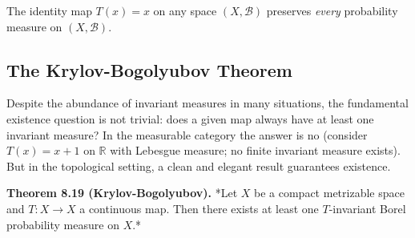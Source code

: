 \begin{example}
The identity map $T(x) = x$ on any space $(X, \mathcal{B})$ preserves \textit{every} probability measure on $(X, \mathcal{B})$.
\end{example}


\subsection{The Krylov-Bogolyubov Theorem}\label{sec:8.3.3}

Despite the abundance of invariant measures in many situations, the fundamental existence question is not trivial: does a given map always have at least one invariant measure? In the measurable category the answer is no (consider $T(x) = x + 1$ on $\mathbb{R}$ with Lebesgue measure; no finite invariant measure exists). But in the topological setting, a clean and elegant result guarantees existence.

\textbf{Theorem 8.19 (Krylov-Bogolyubov).} *Let $X$ be a compact metrizable space and $T: X \to X$ a continuous map. Then there exists at least one $T$-invariant Borel probability measure on $X$.*


